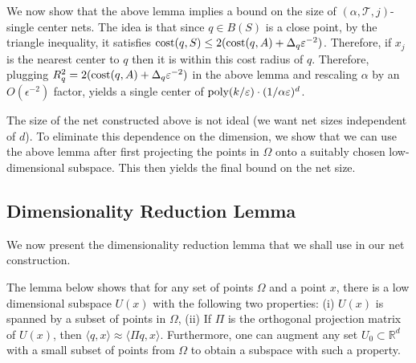 \documentclass[11pt]{article}
\theoremstyle{restate}
\theoremstyle{definition}
\newcommand{\eps}{\ensuremath{\varepsilon}}
\newcommand{\R}{\ensuremath{\mathbb{R}}}
\newcommand{\poly}{\mbox{\rm poly}}
\newcommand{\cost}{\textnormal{cost}}
\begin{document}
We now show that the above lemma implies a bound on the size of  $(\alpha, \mathcal{T}, j)$-single center nets. The idea is that since $q \in B(S)$ is a close point, by the triangle inequality, it satisfies $\cost(q,S) \leq 2(\cost(q,A) + \Delta_q \eps^{-2})$. Therefore, if $x_j$ is the nearest center to $q$ then it is within this cost radius of $q$.   Therefore, plugging $R_q^2 = 2(\cost(q,A) + \Delta_q \eps^{-2})$ in the above lemma and rescaling $\alpha$ by an $O(\epsilon^{-2})$ factor, yields a single center of $\poly(k/\eps) \cdot (1/\alpha \eps)^d$. 

The size of the net constructed above is not ideal (we want net sizes independent of $d$). To eliminate this dependence on the dimension, we show that we can use the above lemma after first projecting the points in $\Omega$ onto a suitably chosen low-dimensional subspace. This then yields the final bound on the net size. 

\subsection{Dimensionality Reduction Lemma}
We now present the dimensionality reduction lemma that we shall use in our net construction. 

The lemma below shows that for any set of points $\Omega$ and a point $x$, there is a low dimensional subspace $U(x)$ with the following two properties: (i) $U(x)$ is spanned by a subset of points in $\Omega$, (ii) If $\Pi$ is the orthogonal projection matrix of $U(x)$, 
 then $\langle q, x \rangle \approx \langle \Pi q, x \rangle$. Furthermore, one can augment any set $U_0 \subset \R^d$ with a small subset of points from $\Omega$ to obtain a subspace with such a property. 
\end{document}
